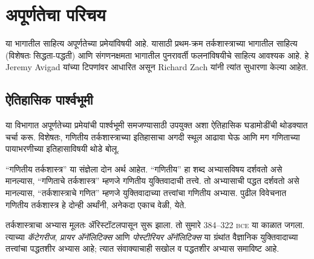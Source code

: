 \chapter{अपूर्णतेचा परिचय}\label{inc:int::chap}
\begin{editorial}
 या भागातील साहित्य अपूर्णतेच्या प्रमेयांविषयी आहे. यासाठी
 प्रथम-क्रम तर्कशास्त्राच्या भागातील साहित्य (विशेषतः सिद्धता-पद्धती)
 आणि संगणनक्षमता भागातील पुनरावर्ती फलनांविषयीचे साहित्य आवश्यक आहे.
 हे Jeremy Avigad यांच्या टिपणांवर आधारित असून Richard Zach यांनी त्यांत
 सुधारणा केल्या आहेत.
\end{editorial}









\section{ऐतिहासिक पार्श्वभूमी}\label{inc:int:bgr:sec}

या विभागात अपूर्णतेच्या प्रमेयांची पार्श्वभूमी समजण्यासाठी उपयुक्त अशा
ऐतिहासिक घडामोडींची थोडक्यात चर्चा करू. विशेषतः, गणितीय तर्कशास्त्राच्या
इतिहासाचा अगदी स्थूल आढावा घेऊ आणि मग गणिताच्या पायाभरणीच्या इतिहासाविषयी
थोडे बोलू.

\begin{digress}
  ``गणितीय तर्कशास्त्र'' या संज्ञेला दोन अर्थ आहेत. ``गणितीय'' हा शब्द
  अभ्यासविषय दर्शवतो असे मानल्यास, ``गणिताचे तर्कशास्त्र'' म्हणजे गणितीय
  युक्तिवादाची तत्त्वे. तो अभ्यासाची पद्धत दर्शवतो असे मानल्यास,
  ``तर्कशास्त्राचे गणित'' म्हणजे युक्तिवादाच्या तत्त्वांचा गणितीय अभ्यास.
  पुढील विवेचनात गणितीय तर्कशास्त्र हे दोन्ही अर्थांनी, अनेकदा एकाच वेळी,
  येते.
\end{digress}

तर्कशास्त्राचा अभ्यास मूलतः ॲरिस्टॉटलपासून सुरू झाला. तो सुमारे
384--322 \textsc{bce} या काळात जगला. त्याच्या \emph{कॅटेगरीज}, \emph{प्रायर
  ॲनॅलिटिक्स} आणि \emph{पोस्टीरियर ॲनॅलिटिक्स} या ग्रंथांत वैज्ञानिक युक्तिवादाच्या
तत्त्वांचा पद्धतशीर अभ्यास आहे; त्यात संवाक्याचाही सखोल व
पद्धतशीर अभ्यास समाविष्ट आहे.

